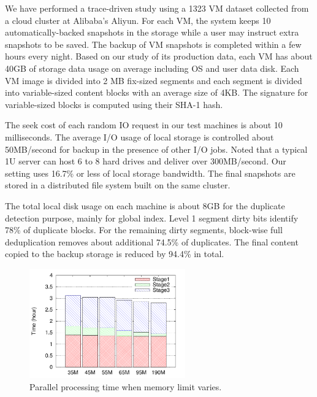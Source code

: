 We have performed a trace-driven study using  a 1323 VM dataset  collected from
a cloud cluster at Alibaba's Aliyun.
For each VM, the system keeps 10 automatically-backed snapshots in the storage while
a user may instruct extra snapshots to be saved.
The backup of VM snapshots is completed within a few  hours every night.
Based on our study of its production  data,  each VM has about  40GB of storage  data usage on average
including OS and user data disk.
Each VM image is  divided into 2 MB fix-sized segments and each segment is divided into
variable-sized content blocks  with an average size of 4KB.
The signature for variable-sized blocks is computed using their SHA-1 hash.

The seek cost of each random IO request in our test machines is about  10 milliseconds.
The average I/O usage of local storage is controlled about 50MB/second for backup
in the presence of other I/O jobs. Noted that a typical 1U server can host
6 to 8  hard drives and deliver over 300MB/second. Our setting uses 16.7\% or less
of local storage bandwidth.
The final snapshots are stored in a distributed file system built on the same
cluster.

The total local disk usage on each machine is about 8GB for the duplicate detection purpose,
mainly for global index.
Level 1 segment dirty bits identify 78\% of duplicate blocks. For the remaining dirty segments,
block-wise full deduplication removes about additional 74.5\% of duplicates.
The final content copied to the backup storage is reduced by 94.4\% in total.

\begin{figure}[htbp]
\centering
\includegraphics[width=0.6\textwidth]{figures/mem_time.pdf}
\caption{Parallel processing time when memory limit varies.}
\label{fig:memory}
\end{figure}

